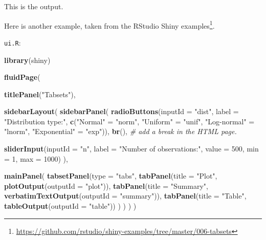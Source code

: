 \documentclass[]{book}
\newenvironment{Shaded}{\begin{snugshade}}{\end{snugshade}}
\newcommand{\CommentTok}[1]{\textcolor[rgb]{0.56,0.35,0.01}{\textit{#1}}}
\newcommand{\DataTypeTok}[1]{\textcolor[rgb]{0.13,0.29,0.53}{#1}}
\newcommand{\DecValTok}[1]{\textcolor[rgb]{0.00,0.00,0.81}{#1}}
\newcommand{\KeywordTok}[1]{\textcolor[rgb]{0.13,0.29,0.53}{\textbf{#1}}}
\newcommand{\NormalTok}[1]{#1}
\newcommand{\StringTok}[1]{\textcolor[rgb]{0.31,0.60,0.02}{#1}}
\renewcommand{\href}[2]{#2\footnote{\url{#1}}}
\theoremstyle{definition}
\theoremstyle{definition}
\theoremstyle{definition}
\theoremstyle{remark}
\begin{document}
This is the output.

Here is another example, taken from the RStudio \href{https://github.com/rstudio/shiny-examples/tree/master/006-tabsets}{Shiny examples}.

\texttt{ui.R}:

\begin{Shaded}
\begin{Highlighting}[]
\KeywordTok{library}\NormalTok{(shiny)}

\KeywordTok{fluidPage}\NormalTok{(}
    
  \KeywordTok{titlePanel}\NormalTok{(}\StringTok{"Tabsets"}\NormalTok{),}
  
  \KeywordTok{sidebarLayout}\NormalTok{(}
    \KeywordTok{sidebarPanel}\NormalTok{(}
      \KeywordTok{radioButtons}\NormalTok{(}\DataTypeTok{inputId =} \StringTok{"dist"}\NormalTok{, }
                   \DataTypeTok{label =} \StringTok{"Distribution type:"}\NormalTok{,}
                   \KeywordTok{c}\NormalTok{(}\StringTok{"Normal"}\NormalTok{ =}\StringTok{ "norm"}\NormalTok{,}
                     \StringTok{"Uniform"}\NormalTok{ =}\StringTok{ "unif"}\NormalTok{,}
                     \StringTok{"Log-normal"}\NormalTok{ =}\StringTok{ "lnorm"}\NormalTok{,}
                     \StringTok{"Exponential"}\NormalTok{ =}\StringTok{ "exp"}\NormalTok{)),}
      \KeywordTok{br}\NormalTok{(), }\CommentTok{# add a break in the HTML page.}
      
      \KeywordTok{sliderInput}\NormalTok{(}\DataTypeTok{inputId =} \StringTok{"n"}\NormalTok{, }
                  \DataTypeTok{label =} \StringTok{"Number of observations:"}\NormalTok{, }
                   \DataTypeTok{value =} \DecValTok{500}\NormalTok{,}
                   \DataTypeTok{min =} \DecValTok{1}\NormalTok{, }
                   \DataTypeTok{max =} \DecValTok{1000}\NormalTok{)}
\NormalTok{    ),}
    
    \KeywordTok{mainPanel}\NormalTok{(}
      \KeywordTok{tabsetPanel}\NormalTok{(}\DataTypeTok{type =} \StringTok{"tabs"}\NormalTok{, }
        \KeywordTok{tabPanel}\NormalTok{(}\DataTypeTok{title =} \StringTok{"Plot"}\NormalTok{, }\KeywordTok{plotOutput}\NormalTok{(}\DataTypeTok{outputId =} \StringTok{"plot"}\NormalTok{)), }
        \KeywordTok{tabPanel}\NormalTok{(}\DataTypeTok{title =} \StringTok{"Summary"}\NormalTok{, }\KeywordTok{verbatimTextOutput}\NormalTok{(}\DataTypeTok{outputId =} \StringTok{"summary"}\NormalTok{)), }
        \KeywordTok{tabPanel}\NormalTok{(}\DataTypeTok{title =} \StringTok{"Table"}\NormalTok{, }\KeywordTok{tableOutput}\NormalTok{(}\DataTypeTok{outputId =} \StringTok{"table"}\NormalTok{))}
\NormalTok{      )}
\NormalTok{    )}
\NormalTok{  )}
\NormalTok{)}
\end{Highlighting}
\end{Shaded}
\end{document}
